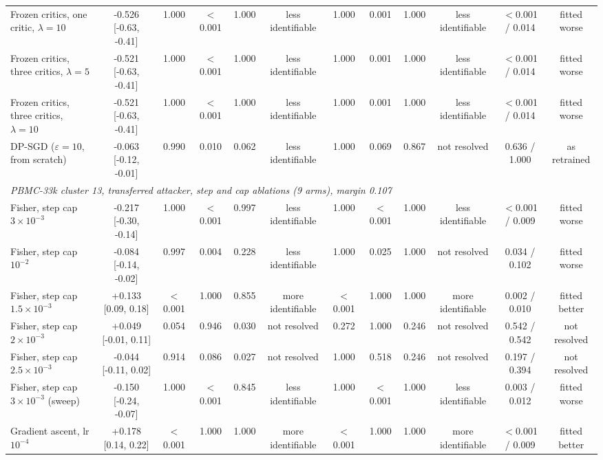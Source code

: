 \begin{tabular}{lccccccccccc}
Frozen critics, one critic, $\lambda=10$ & -0.526 [-0.63, -0.41] & 1.000 & $<$0.001 & 1.000 & less identifiable & 1.000 & 0.001 & 1.000 & less identifiable & $<$0.001 / 0.014 & fitted worse \\
Frozen critics, three critics, $\lambda=5$ & -0.521 [-0.63, -0.41] & 1.000 & $<$0.001 & 1.000 & less identifiable & 1.000 & 0.001 & 1.000 & less identifiable & $<$0.001 / 0.014 & fitted worse \\
Frozen critics, three critics, $\lambda=10$ & -0.521 [-0.63, -0.41] & 1.000 & $<$0.001 & 1.000 & less identifiable & 1.000 & 0.001 & 1.000 & less identifiable & $<$0.001 / 0.014 & fitted worse \\
DP-SGD ($\varepsilon=10$, from scratch) & -0.063 [-0.12, -0.01] & 0.990 & 0.010 & 0.062 & less identifiable & 1.000 & 0.069 & 0.867 & not resolved & 0.636 / 1.000 & as retrained \\
\midrule
\multicolumn{12}{l}{\emph{PBMC-33k cluster 13, transferred attacker, step and cap ablations (9 arms), margin 0.107}} \\
Fisher, step cap $3\times 10^{-3}$ & -0.217 [-0.30, -0.14] & 1.000 & $<$0.001 & 0.997 & less identifiable & 1.000 & $<$0.001 & 1.000 & less identifiable & $<$0.001 / 0.009 & fitted worse \\
Fisher, step cap $10^{-2}$ & -0.084 [-0.14, -0.02] & 0.997 & 0.004 & 0.228 & less identifiable & 1.000 & 0.025 & 1.000 & not resolved & 0.034 / 0.102 & fitted worse \\
Fisher, step cap $1.5\times 10^{-3}$ & +0.133 [0.09, 0.18] & $<$0.001 & 1.000 & 0.855 & more identifiable & $<$0.001 & 1.000 & 1.000 & more identifiable & 0.002 / 0.010 & fitted better \\
Fisher, step cap $2\times 10^{-3}$ & +0.049 [-0.01, 0.11] & 0.054 & 0.946 & 0.030 & not resolved & 0.272 & 1.000 & 0.246 & not resolved & 0.542 / 0.542 & not resolved \\
Fisher, step cap $2.5\times 10^{-3}$ & -0.044 [-0.11, 0.02] & 0.914 & 0.086 & 0.027 & not resolved & 1.000 & 0.518 & 0.246 & not resolved & 0.197 / 0.394 & not resolved \\
Fisher, step cap $3\times 10^{-3}$ (sweep) & -0.150 [-0.24, -0.07] & 1.000 & $<$0.001 & 0.845 & less identifiable & 1.000 & $<$0.001 & 1.000 & less identifiable & 0.003 / 0.012 & fitted worse \\
Gradient ascent, lr $10^{-4}$ & +0.178 [0.14, 0.22] & $<$0.001 & 1.000 & 1.000 & more identifiable & $<$0.001 & 1.000 & 1.000 & more identifiable & $<$0.001 / 0.009 & fitted better \\

\end{tabular}
